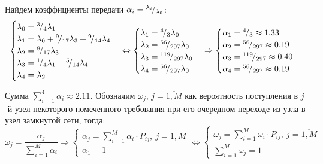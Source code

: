 Найдем коэффициенты передачи $\alpha_i = {}^{\lambda_i}\!/_{\lambda_0}$:
\begin{displaymath}
	\begin{cases}
		\lambda_0 = \sfrac{3}{4} \lambda_1 \\
		\lambda_1 = \lambda_0 + \sfrac{9}{17} \lambda_3 + \sfrac{9}{14} \lambda_4 \\
		\lambda_2 = \sfrac{8}{17} \lambda_3 \\
		\lambda_3 = \sfrac{1}{4} \lambda_1 + \sfrac{5}{14} \lambda_4 \\
		\lambda_4 = \lambda_2
	\end{cases} \Leftrightarrow \begin{cases}
		\lambda_1 = \sfrac{4}{3} \lambda_0 \\
		\lambda_2 = \sfrac{56}{297} \lambda_0 \\
		\lambda_3 = \sfrac{119}{297} \lambda_0 \\
		\lambda_4 = \sfrac{56}{297} \lambda_0
	\end{cases} \Rightarrow \begin{cases}
		\alpha_1 = \sfrac{4}{3} \approx 1.33 \\
		\alpha_2 = \sfrac{56}{297} \approx 0.19 \\
		\alpha_3 = \sfrac{119}{297} \approx 0.40 \\
		\alpha_4 = \sfrac{56}{297} \approx 0.19
	\end{cases}
\end{displaymath}

Сумма $\sum_{i=1}^{4} \alpha_i \approx 2.11$. Обозначим $\omega_j$, $j = \overline{1,M}$ как вероятность поступления в $j$-й узел некоторого помеченного требования при его очередном переходе из узла в узел замкнутой сети, тогда:
\begin{displaymath}
	\omega_j = \frac{\alpha_j}{\sum \limits_{i=1}^{M} \alpha_i} \Rightarrow
	\begin{cases}
		\alpha_j = \sum \limits_{i=1}^{M} \alpha_i \cdot P_{ij},\ j = \overline{1,M} \\
		\alpha_1 = 1
	\end{cases} \Leftrightarrow \begin{cases}
		\omega_j = \sum \limits_{i=1}^{M} \omega_i \cdot P_{ij},\ j = \overline{1,M} \\
		\sum \limits_{i=1}^{M} \omega_j = 1
	\end{cases}
\end{displaymath}


